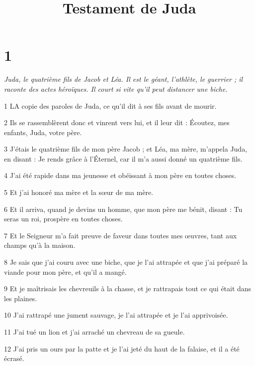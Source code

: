

\title{Testament de Juda}

\chapter{1}

\par \textit{Juda, le quatrième fils de Jacob et Léa. Il est le géant, l'athlète, le guerrier ; il raconte des actes héroïques. Il court si vite qu'il peut distancer une biche.}

\par 1 LA copie des paroles de Juda, ce qu'il dit à ses fils avant de mourir.

\par 2 Ils se rassemblèrent donc et vinrent vers lui, et il leur dit : Écoutez, mes enfants, Juda, votre père.

\par 3 J'étais le quatrième fils de mon père Jacob ; et Léa, ma mère, m'appela Juda, en disant : Je rends grâce à l'Éternel, car il m'a aussi donné un quatrième fils.

\par 4 J'ai été rapide dans ma jeunesse et obéissant à mon père en toutes choses.

\par 5 Et j'ai honoré ma mère et la sœur de ma mère.

\par 6 Et il arriva, quand je devins un homme, que mon père me bénit, disant : Tu seras un roi, prospère en toutes choses.

\par 7 Et le Seigneur m'a fait preuve de faveur dans toutes mes œuvres, tant aux champs qu'à la maison.

\par 8 Je sais que j'ai couru avec une biche, que je l'ai attrapée et que j'ai préparé la viande pour mon père, et qu'il a mangé.

\par 9 Et je maîtrisais les chevreuils à la chasse, et je rattrapais tout ce qui était dans les plaines.

\par 10 J'ai rattrapé une jument sauvage, je l'ai attrapée et je l'ai apprivoisée.

\par 11 J'ai tué un lion et j'ai arraché un chevreau de sa gueule.

\par 12 J'ai pris un ours par la patte et je l'ai jeté du haut de la falaise, et il a été écrasé.

